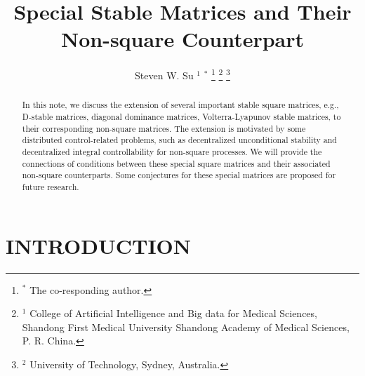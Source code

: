 \documentclass{article}
\title{Special Stable Matrices and Their Non-square Counterpart}
\author{ Steven W. Su $^1$ $^*$
\AND
\thanks{$^{*}$ The co-responding author.}
\thanks{$^{1}$ College of Artificial Intelligence and Big data for Medical Sciences, Shandong First Medical University
Shandong Academy of Medical Sciences, P. R. China.}
\thanks{$^{2}$ University of Technology, Sydney, Australia.}  
}
\begin{document}
\maketitle

\begin{abstract}
In this note, we discuss the extension of several important stable square matrices, e.g., D-stable matrices, diagonal dominance matrices, Volterra-Lyapunov stable matrices, to their corresponding non-square matrices. The extension is motivated by some distributed control-related problems, such as decentralized unconditional stability and decentralized integral controllability for non-square processes. We will provide the connections of conditions between these special square matrices and their associated non-square counterparts. Some conjectures for these special matrices are proposed for future research.    
\end{abstract}


\section{INTRODUCTION}
%
%
%
\end{document}
